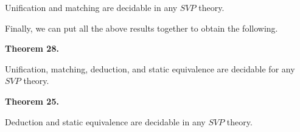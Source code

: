 \documentclass[10pt,a4paper]{amsart}
\begin{document}
 
Unification and matching are decidable in any $\mathit{SVP}$ theory.\par
 
 
 
 
Finally, we can put all the above results together to obtain the following.\par
 
 
 
\par\medskip\noindent\textbf{Theorem 28.}\par
 
 
Unification, matching, deduction, and static equivalence are decidable for any $\mathit{SVP}$ theory.\par
 
 
 
 

 
\par\medskip\noindent\textbf{Theorem 25.}\par
 
 
Deduction and static equivalence are decidable in any $\mathit{SVP}$ theory.\par
 
 
\end{document}
